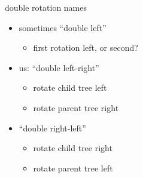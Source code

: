\begin{frame}{double rotation names}
    \begin{itemize}
    \item sometimes ``double left''
        \begin{itemize}
        \item first rotation left, or second?
        \end{itemize}
    \item us: ``double left-right''
        \begin{itemize}
        \item rotate child tree left
        \item rotate parent tree right
        \end{itemize}
    \item ``double right-left''
        \begin{itemize}
        \item rotate child tree right
        \item rotate parent tree left
        \end{itemize}
    \end{itemize}
\end{frame}
